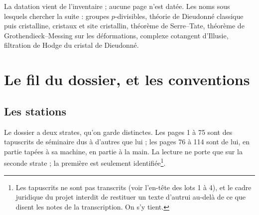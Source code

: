 \documentclass[11pt,a4paper]{article}
\begin{document}
\begin{resume}
La datation vient de l'inventaire ; aucune page n'est datée. Les noms sous
lesquels chercher la suite : groupes $p$-divisibles, théorie de Dieudonné
classique puis cristalline, cristaux et site cristallin, théorème de
Serre–Tate, théorème de Grothendieck–Messing sur les déformations,
complexe cotangent d'Illusie, filtration de Hodge du cristal de Dieudonné.

\end{resume}

\section*{Le fil du dossier, et les conventions}

\subsection*{Les stations}

Le dossier a deux strates, qu'on garde distinctes. Les pages 1 à 75 sont
des tapuscrits de séminaire dus à d'autres que lui ; les pages 76 à 114
sont de lui, en partie tapées à sa machine, en partie à la main. La lecture
ne porte que sur la seconde strate ; la première est seulement
identifiée\footnote{Les tapuscrits ne sont pas transcrits (voir l'en-tête
des lots 1 à 4), et le cadre juridique du projet interdit de restituer un
texte d'autrui au-delà de ce que disent les notes de la transcription. On
s'y tient.}.
\end{document}
